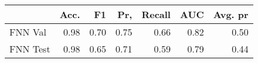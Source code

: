 \begin{tabular}{lrrrrrr}
\toprule
{} &  Acc. &    F1 &   Pr, &  Recall &   AUC &  Avg. pr \\
\midrule
FNN Val  &  0.98 &  0.70 &  0.75 &    0.66 &  0.82 &     0.50 \\
FNN Test &  0.98 &  0.65 &  0.71 &    0.59 &  0.79 &     0.44 \\
\bottomrule
\end{tabular}
